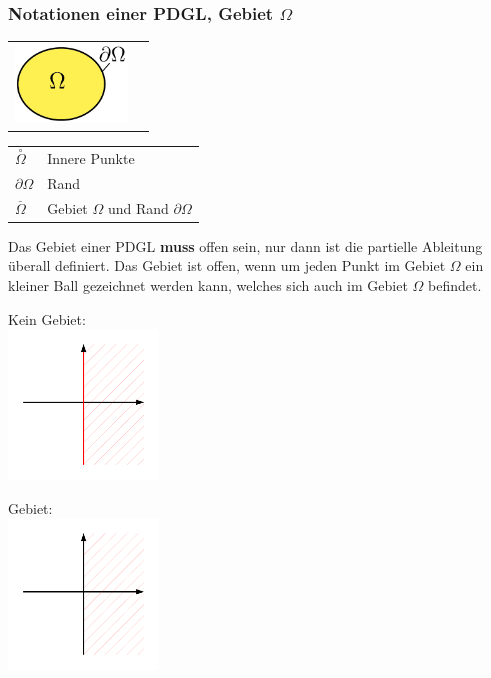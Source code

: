 \subsubsection{Notationen einer PDGL, Gebiet $\Omega$}
\begin{minipage}{4cm}
	\begin{tabular}{ll}
	\includegraphics[width=3cm]{Content/Theory/Gebiet}&
	\end{tabular}
\end{minipage}
\begin{minipage}{4cm}	
	\begin{tabular}{ll}
		$\overset{\circ}{\Omega}$ & Innere Punkte\\
		$\partial\Omega$ & Rand\\
		$\overset{\_}{\Omega}$ & Gebiet $\Omega$ und Rand $\partial\Omega$\\
	\end{tabular}
\end{minipage}

Das Gebiet einer PDGL \textbf{muss} offen sein, nur dann ist die partielle
Ableitung überall definiert. Das Gebiet ist offen, wenn um jeden Punkt im Gebiet
$\Omega$ ein kleiner Ball gezeichnet werden kann, welches sich auch im Gebiet $\Omega$ befindet.\\

\begin{minipage}{4cm}
	Kein Gebiet:\\
	\includegraphics[width=4cm]{Content/Theory/gebiet_1.pdf}\\

\end{minipage}
\begin{minipage}{4cm}
  	Gebiet:\\
  	\includegraphics[width=4cm]{Content/Theory/gebiet_2.pdf}\\
\end{minipage}

